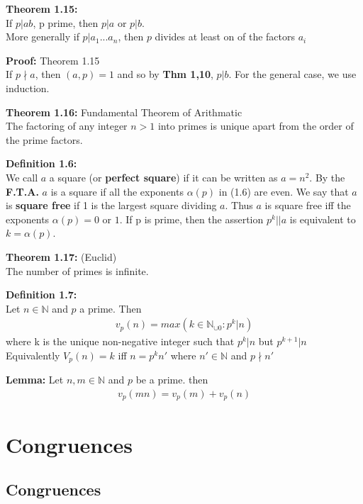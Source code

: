 \documentclass[a4paper]{article}
\begin{document}

\textbf{Theorem 1.15:}\\
If $p|ab$, p prime, then $p|a$ or $p|b$.\\
More generally if $p|a_1...a_n$, then $p$ divides at least on of the factors $a_i$

\textbf{Proof:} Theorem 1.15\\
If $p\nmid a$, then $(a,p)=1$ and so by \textbf{Thm 1,10}, $p|b$. For the general case, we use induction.

\textbf{Theorem 1.16:} Fundamental Theorem of Arithmatic\\
The factoring of any integer $n>1$ into primes is unique apart from the order of the prime factors.

\textbf{Definition 1.6:}\\
We call $a$ a square (or \textbf{perfect square}) if it can be written as $a=n^2$. By the \textbf{F.T.A.} $a$ is a square if all the exponents $\alpha(p)$ in (1.6) are even. We say that $a$ is \textbf{square free} if 1 is the largest square dividing $a$. Thus $a$ is square free iff the exponents $\alpha(p)=0$ or $1$. If p is prime, then the assertion $p^k||a$ is equivalent to $k=\alpha(p)$.

\textbf{Theorem 1.17:} (Euclid)\\
The number of primes is infinite.

\textbf{Definition 1.7:}\\
Let $n\in\mathbb{N}$ and $p$ a prime. Then
\begin{align}
    v_p(n) = max(k\in\mathbb{N}_{\cup0}:p^k|n)
\end{align}
where k is the unique non-negative integer such that $p^k|n$ but $p^{k+1}|n$\\
Equivalently $V_p(n)=k$ iff $n=p^kn'$ where $n'\in\mathbb{N}$ and $p\nmid n'$

\textbf{Lemma:}
Let $n,m\in\mathbb{N}$ and $p$ be a prime. then
\begin{align}
    v_p(mn)=v_p(m)+v_p(n)
\end{align}


\section{Congruences}

\subsection{Congruences}
\end{document}
